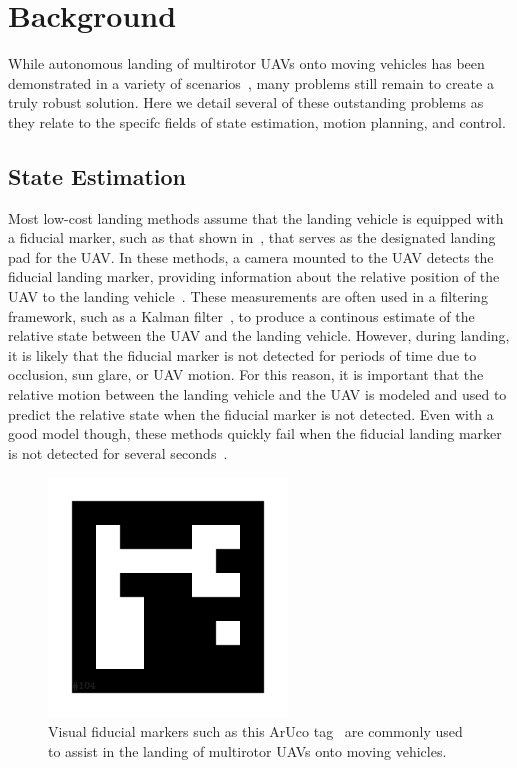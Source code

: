 \section{Background}

While autonomous landing of multirotor UAVs onto moving vehicles has been
demonstrated in a variety of scenarios~\cite{wynn2019visual}, many problems still remain to
create a truly robust solution. Here we detail several of these outstanding
problems as they relate to the specifc fields of state estimation, motion
planning, and control.

\subsection{State Estimation}
Most low-cost landing methods assume that the landing vehicle is equipped with a
fiducial marker, such as that shown in~, that serves as
the designated landing pad for the UAV.
In these methods, a camera mounted to the UAV detects the fiducial landing marker, providing
information about the relative position of the UAV to the landing
vehicle~\cite{borowczyk2017autonomous}. These measurements are often used in a
filtering framework, such as a Kalman filter~\cite{kalman}, to produce a
continous estimate of the relative state between the UAV and the landing
vehicle. However, during landing, it is likely
that the fiducial marker is not detected for periods of time due to occlusion,
sun glare, or UAV motion. For this reason, it is important that the relative
motion between the landing vehicle and the UAV is modeled and used to predict
the relative state when the fiducial marker is not detected.
Even with a good model though,
these methods quickly fail when the fiducial landing
marker is not detected for several seconds~\cite{ling2014precision}.

\begin{figure}[h]
  \centering
  \includegraphics[width=2.5in]{figures/aruco_104.png}
  \caption[Visual Fiducial Landing Marker]{Visual fiducial markers such as this
    ArUco tag~\cite{garrido2016generation} are commonly used to assist in the
  landing of multirotor UAVs onto moving vehicles.}
  \label{fig:aruco_tag}
\end{figure}

